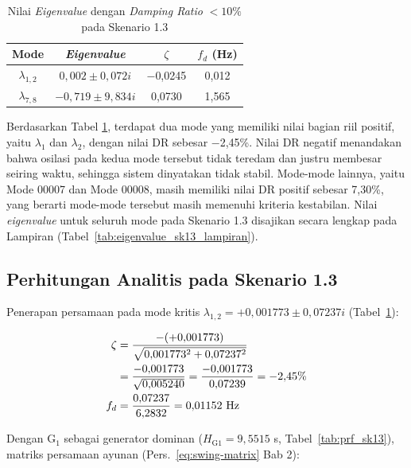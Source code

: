 \begin{table}[H]
	\caption{Nilai \textit{Eigenvalue} dengan \textit{Damping Ratio} $<10\%$
	pada Skenario 1.3}
	\vspace{0.5em}
	\centering
	\fontsize{12}{14.4}\selectfont
	\setlength{\tabcolsep}{6pt}
	\begin{tabular}{c c c c}
		\toprule
		\textbf{Mode} & \textbf{\textit{Eigenvalue}} & \textbf{$\zeta$} &
		\textbf{$f_d$ (Hz)} \\
		\midrule
		$\lambda_{1,2}$ & $0{,}002 \pm 0{,}072i$ & $-$0,0245 & 0,012 \\
		$\lambda_{7,8}$ & $-0{,}719 \pm 9{,}834i$ & 0,0730 & 1,565 \\
		\bottomrule
	\end{tabular}
	\label{tab:eigenvalue_sk13}
\end{table}

Berdasarkan Tabel \ref{tab:eigenvalue_sk13}, terdapat dua mode yang memiliki
nilai bagian riil positif, yaitu $\lambda_1$ dan $\lambda_2$, dengan nilai DR
sebesar $-$2,45\%. Nilai DR negatif menandakan bahwa osilasi pada kedua mode
tersebut tidak teredam dan justru membesar seiring waktu, sehingga sistem
dinyatakan tidak stabil. Mode-mode lainnya, yaitu Mode 00007 dan Mode 00008,
masih memiliki nilai DR positif sebesar 7,30\%, yang berarti mode-mode tersebut
masih memenuhi kriteria kestabilan. Nilai \textit{eigenvalue} untuk seluruh mode
pada Skenario 1.3 disajikan secara lengkap pada Lampiran (Tabel~\ref{tab:eigenvalue_sk13_lampiran}).

\subsection{Perhitungan Analitis pada Skenario 1.3}

Penerapan persamaan pada mode kritis $\lambda_{1,2} = +0{,}001773 \pm 0{,}07237i$
(Tabel~\ref{tab:eigenvalue_sk13}):

\begin{align}
    \zeta &= \frac{-(+0{,}001773)}{\sqrt{0{,}001773^2 + 0{,}07237^2}} \notag \\
          &= \frac{-0{,}001773}{\sqrt{0{,}005240}}
           = \frac{-0{,}001773}{0{,}07239} = -2{,}45\% \\
    f_d   &= \frac{0{,}07237}{6{,}2832} = 0{,}01152 \text{ Hz}
\end{align}

Dengan G$_1$ sebagai generator dominan ($H_{\text{G1}} = 9{,}5515$ s,
Tabel~\ref{tab:prf_sk13}), matriks persamaan ayunan (Pers.~\ref{eq:swing-matrix}
Bab 2):

